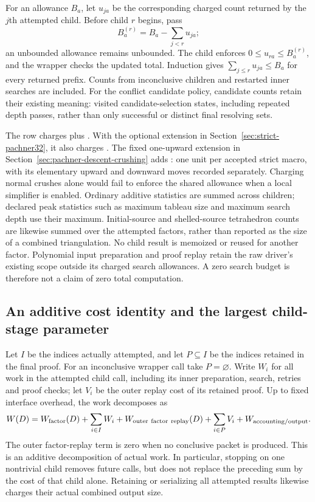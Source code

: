 For an allowance $B_a$, let $u_{ja}$ be the corresponding charged count
returned by the $j$th attempted child.  Before child $r$ begins, pass
\[
 B_a^{(r)}=B_a-\sum_{j<r}u_{ja};
\]
an unbounded allowance remains unbounded.  The child enforces
$0\le u_{ra}\le B_a^{(r)}$, and the wrapper checks the updated total.
Induction gives $\sum_{j\le r}u_{ja}\le B_a$ for every returned prefix.
Counts from inconclusive children and restarted inner searches are included.
For the conflict candidate policy, candidate counts retain their existing
meaning: visited candidate-selection states, including repeated depth
passes, rather than only successful or distinct final resolving sets.

The  row charges  plus
.  With the optional extension in
Section~\ref{sec:strict-pachner32}, it also charges .
The fixed one-upward extension in Section~\ref{sec:pachner-descent-crushing}
adds : one unit per accepted strict macro,
with its elementary upward and downward moves recorded separately.
Charging normal crushes alone would fail to enforce the shared allowance
when a local simplifier is enabled.  Ordinary additive
statistics are summed across children; declared peak statistics such as
maximum tableau size and maximum search depth use their maximum.
Initial-source and shelled-source tetrahedron counts are likewise summed
over the attempted factors, rather than reported as the size of a combined
triangulation.  No child result is memoized or reused for another factor.
Polynomial input preparation and proof replay retain the raw driver's existing scope
outside its charged search allowances.  A zero search budget is therefore
not a claim of zero total computation.

\subsection{An additive cost identity and the largest child-stage parameter}

Let $I$ be the indices actually attempted, and let $P\subseteq I$ be the
indices retained in the final proof.  For an inconclusive wrapper call take
$P=\varnothing$.  Write $W_i$ for all work in the attempted child call,
including its inner preparation, search, retries and proof checks; let
$V_i$ be the outer replay cost of its retained proof.  Up to fixed interface
overhead, the work decomposes as
\[
 W(D)=W_{\rm factor}(D)+\sum_{i\in I}W_i
      +W_{\rm outer\ factor\ replay}(D)+\sum_{i\in P}V_i
      +W_{\rm accounting/output}.
\]
The outer factor-replay term is zero when no conclusive packet is produced.
This is an additive decomposition of actual work.  In particular, stopping
on one nontrivial child removes future calls, but does not replace the
preceding sum by the cost of that child alone.  Retaining or serializing
all attempted results likewise charges their actual combined output size.

